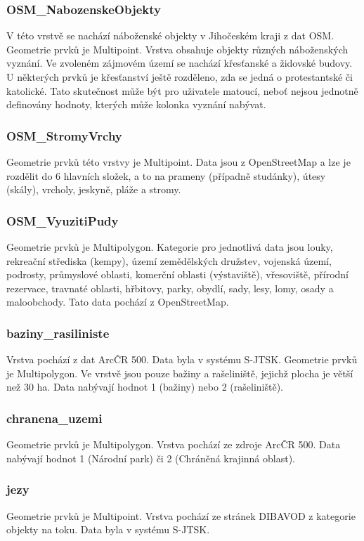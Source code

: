 \documentclass[a4paper, 12pt]{article}
\begin{document}
\subsubsection{OSM\_NabozenskeObjekty}
V této vrstvě se nachází náboženské objekty v Jihočeském kraji z dat OSM. Geometrie prvků je Multipoint. Vrstva obsahuje objekty různých náboženských vyznání. Ve zvoleném zájmovém území se nachází křesťanské a židovské budovy. U některých prvků je křesťanství ještě rozděleno, zda se jedná o protestantské či katolické. Tato skutečnost může být pro uživatele matoucí, neboť nejsou jednotně definovány hodnoty, kterých může kolonka vyznání nabývat.

\subsubsection{OSM\_StromyVrchy}
Geometrie prvků této vrstvy je Multipoint. Data jsou z OpenStreetMap a lze je rozdělit do 6 hlavních složek, a to na prameny (případně studánky), útesy (skály), vrcholy, jeskyně, pláže a stromy.

\subsubsection{OSM\_VyuzitiPudy}
Geometrie prvků je Multipolygon. Kategorie pro jednotlivá data jsou louky, rekreační střediska (kempy), území zemědělských družstev, vojenská území, podrosty, průmyslové oblasti, komerční oblasti (výstaviště), vřesoviště, přírodní rezervace, travnaté oblasti, hřbitovy, parky, obydlí, sady, lesy, lomy, osady a maloobchody. Tato data pochází z OpenStreetMap.


\subsubsection{baziny\_rasiliniste}
Vrstva pochází z dat ArcČR 500. Data byla v systému S-JTSK. Geometrie prvků je Multipolygon. Ve vrstvě jsou pouze bažiny a rašeliniště, jejichž plocha je větší než 30 ha. Data nabývají hodnot 1 (bažiny) nebo 2 (rašeliniště).

\subsubsection{chranena\_uzemi}
Geometrie prvků je Multipolygon. Vrstva pochází ze zdroje ArcČR 500. Data nabývají hodnot 1 (Národní park) či 2 (Chráněná krajinná oblast).

\subsubsection{jezy}
Geometrie prvků je Multipoint. Vrstva pochází ze stránek DIBAVOD z kategorie objekty na toku. Data byla v systému S-JTSK.
\end{document}
